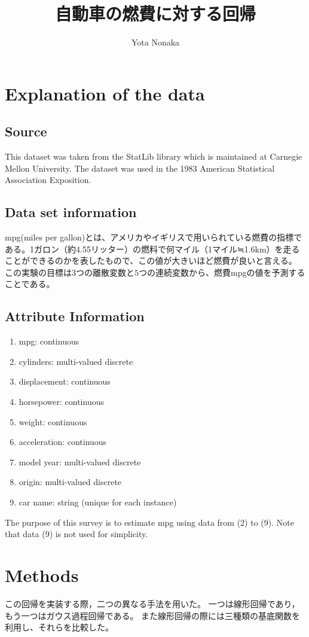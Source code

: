 \documentclass{jarticle}
\title{\vspace{-3.0cm}自動車の燃費に対する回帰}
\author{Yota Nonaka}
\date{}
\begin{document}
\maketitle
\section{Explanation of the data}
\subsection{Source}
This dataset was taken from the StatLib library which is maintained at Carnegie Mellon University. The dataset was used in the 1983 American Statistical Association Exposition.
\subsection{Data set information}
mpg(miles per gallon)とは、アメリカやイギリスで用いられている燃費の指標である。1ガロン（約4.55リッター）の燃料で何マイル（1マイル≒1.6km）を走ることができるのかを表したもので、この値が大きいほど燃費が良いと言える。\\
この実験の目標は$3$つの離散変数と$5$つの連続変数から、燃費mpgの値を予測することである。

\subsection{Attribute Information}
\begin{enumerate}
\item mpg: continuous
\item cylinders: multi-valued discrete
\item displacement: continuous
\item horsepower: continuous
\item weight: continuous
\item acceleration: continuous
\item model year: multi-valued discrete
\item origin: multi-valued discrete
\item car name: string (unique for each instance)
\end{enumerate}

The purpose of this survey is to estimate mpg using data from (2) to (9).
Note that data (9) is not used for simplicity.

\section{Methods}
この回帰を実装する際，二つの異なる手法を用いた。
一つは線形回帰であり，もう一つはガウス過程回帰である。
また線形回帰の際には三種類の基底関数を利用し、それらを比較した。
\end{document}
